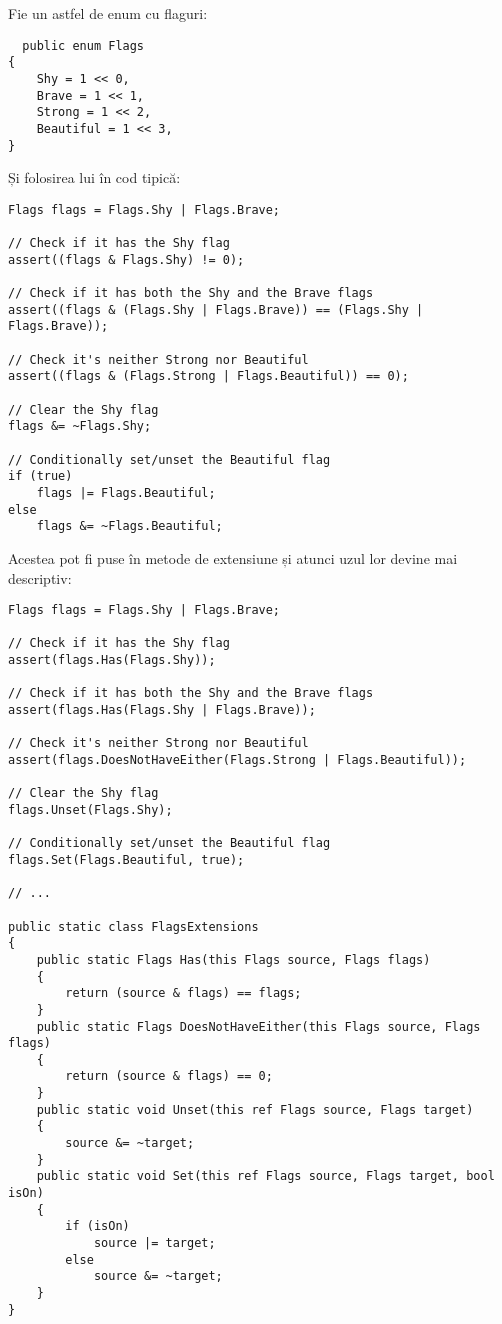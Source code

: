 \documentclass[a4paper,12pt]{report}
\begin{document}
Fie un astfel de enum cu flaguri:

\begin{lstlisting}
  public enum Flags
{
    Shy = 1 << 0,
    Brave = 1 << 1,
    Strong = 1 << 2,
    Beautiful = 1 << 3,
}
\end{lstlisting}

Și folosirea lui în cod tipică:

\begin{lstlisting}
Flags flags = Flags.Shy | Flags.Brave;

// Check if it has the Shy flag
assert((flags & Flags.Shy) != 0);

// Check if it has both the Shy and the Brave flags
assert((flags & (Flags.Shy | Flags.Brave)) == (Flags.Shy | Flags.Brave));

// Check it's neither Strong nor Beautiful
assert((flags & (Flags.Strong | Flags.Beautiful)) == 0);

// Clear the Shy flag
flags &= ~Flags.Shy;

// Conditionally set/unset the Beautiful flag
if (true)
    flags |= Flags.Beautiful;
else
    flags &= ~Flags.Beautiful;
\end{lstlisting}

Acestea pot fi puse în metode de extensiune și atunci uzul lor devine mai descriptiv:

\begin{lstlisting}
Flags flags = Flags.Shy | Flags.Brave;

// Check if it has the Shy flag
assert(flags.Has(Flags.Shy));

// Check if it has both the Shy and the Brave flags
assert(flags.Has(Flags.Shy | Flags.Brave));

// Check it's neither Strong nor Beautiful
assert(flags.DoesNotHaveEither(Flags.Strong | Flags.Beautiful));

// Clear the Shy flag
flags.Unset(Flags.Shy);

// Conditionally set/unset the Beautiful flag
flags.Set(Flags.Beautiful, true);

// ...

public static class FlagsExtensions
{
    public static Flags Has(this Flags source, Flags flags)
    {
        return (source & flags) == flags;
    }
    public static Flags DoesNotHaveEither(this Flags source, Flags flags)
    {
        return (source & flags) == 0;
    }
    public static void Unset(this ref Flags source, Flags target)
    {
        source &= ~target;
    }
    public static void Set(this ref Flags source, Flags target, bool isOn)
    {
        if (isOn)
            source |= target;
        else
            source &= ~target;
    }
}
\end{lstlisting}
\end{document}
